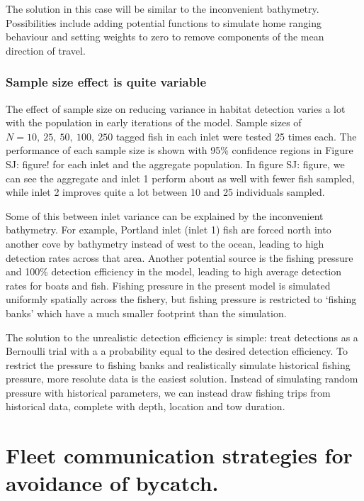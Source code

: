 \documentclass{article}
\newcommand{\sj}[1]{{\color{red}\mbox{}\marginpar{\raggedleft\hspace{0pt}*} SJ: #1}}
\begin{document}
The solution in this case will be similar to the inconvenient bathymetry. Possibilities include adding potential functions to simulate home ranging behaviour and setting weights to zero to remove components of the mean direction of travel.

\subsubsection*{Sample size effect is quite variable}

The effect of sample size on reducing variance in habitat detection varies a lot with the population in early iterations of the model. Sample sizes of $N = 10,~25,~50,~100,~250$ tagged fish in each inlet were tested 25 times each. The performance of each sample size is shown with 95\% confidence regions in Figure \sj{figure!} for each inlet and the aggregate population.  In figure \sj{figure}, we can see the aggregate and inlet 1 perform about as well with fewer fish sampled, while inlet 2 improves quite a lot between 10 and 25 individuals sampled.

Some of this between inlet variance can be explained by the inconvenient bathymetry. For example, Portland inlet (inlet 1) fish are forced north into another cove by bathymetry instead of west to the ocean, leading to high detection rates across that area. Another potential source is the fishing pressure and 100\% detection efficiency in the model, leading to high average detection rates for boats and fish. Fishing pressure in the present model is simulated uniformly spatially across the fishery, but fishing pressure is restricted to `fishing banks' which have a much smaller footprint than the simulation.

The solution to the unrealistic detection efficiency is simple: treat detections as a Bernoulli trial with a a probability equal to the desired detection efficiency. To restrict the pressure to fishing banks and realistically simulate historical fishing pressure, more resolute data is the easiest solution. Instead of simulating random pressure with historical parameters, we can instead draw fishing trips from historical data, complete with depth, location and tow duration.

  
\section{Fleet communication strategies for avoidance of bycatch.} \label{sec:FleetComm}
\end{document}
